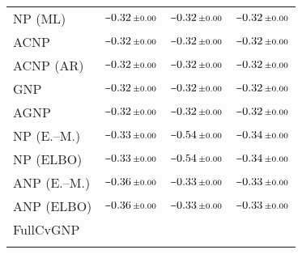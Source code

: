 \begin{tabular}[t]{lccc}
NP (ML) & $\scalebox{0.7}[1]{$-$}0.32\,{ \scriptstyle \pm  0.00 }$ & $\scalebox{0.7}[1]{$-$}0.32\,{ \scriptstyle \pm  0.00 }$ & $\scalebox{0.7}[1]{$-$}0.32\,{ \scriptstyle \pm  0.00 }$ \\ 
ACNP & $\scalebox{0.7}[1]{$-$}0.32\,{ \scriptstyle \pm  0.00 }$ & $\scalebox{0.7}[1]{$-$}0.32\,{ \scriptstyle \pm  0.00 }$ & $\scalebox{0.7}[1]{$-$}0.32\,{ \scriptstyle \pm  0.00 }$ \\ 
ACNP (AR) & $\scalebox{0.7}[1]{$-$}0.32\,{ \scriptstyle \pm  0.00 }$ & $\scalebox{0.7}[1]{$-$}0.32\,{ \scriptstyle \pm  0.00 }$ & $\scalebox{0.7}[1]{$-$}0.32\,{ \scriptstyle \pm  0.00 }$ \\ 
GNP & $\scalebox{0.7}[1]{$-$}0.32\,{ \scriptstyle \pm  0.00 }$ & $\scalebox{0.7}[1]{$-$}0.32\,{ \scriptstyle \pm  0.00 }$ & $\scalebox{0.7}[1]{$-$}0.32\,{ \scriptstyle \pm  0.00 }$ \\ 
AGNP & $\scalebox{0.7}[1]{$-$}0.32\,{ \scriptstyle \pm  0.00 }$ & $\scalebox{0.7}[1]{$-$}0.32\,{ \scriptstyle \pm  0.00 }$ & $\scalebox{0.7}[1]{$-$}0.32\,{ \scriptstyle \pm  0.00 }$ \\ 
NP (E.--M.) & $\scalebox{0.7}[1]{$-$}0.33\,{ \scriptstyle \pm  0.00 }$ & $\scalebox{0.7}[1]{$-$}0.54\,{ \scriptstyle \pm  0.00 }$ & $\scalebox{0.7}[1]{$-$}0.34\,{ \scriptstyle \pm  0.00 }$ \\ 
NP (ELBO) & $\scalebox{0.7}[1]{$-$}0.33\,{ \scriptstyle \pm  0.00 }$ & $\scalebox{0.7}[1]{$-$}0.54\,{ \scriptstyle \pm  0.00 }$ & $\scalebox{0.7}[1]{$-$}0.34\,{ \scriptstyle \pm  0.00 }$ \\ 
ANP (E.--M.) & $\scalebox{0.7}[1]{$-$}0.36\,{ \scriptstyle \pm  0.00 }$ & $\scalebox{0.7}[1]{$-$}0.33\,{ \scriptstyle \pm  0.00 }$ & $\scalebox{0.7}[1]{$-$}0.33\,{ \scriptstyle \pm  0.00 }$ \\ 
ANP (ELBO) & $\scalebox{0.7}[1]{$-$}0.36\,{ \scriptstyle \pm  0.00 }$ & $\scalebox{0.7}[1]{$-$}0.33\,{ \scriptstyle \pm  0.00 }$ & $\scalebox{0.7}[1]{$-$}0.33\,{ \scriptstyle \pm  0.00 }$ \\ 
FullCvGNP &  &  &  \\ 
\bottomrule \\ 
\end{tabular} 
